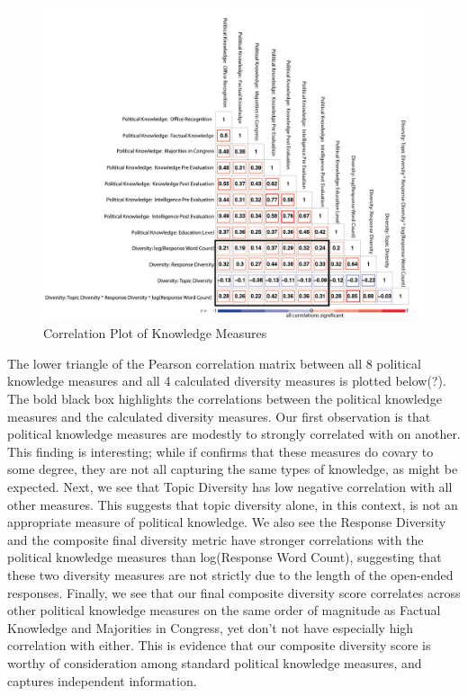 \documentclass[12pt]{article}
\begin{document}
\begin{figure}
\includegraphics[width=\textwidth]{../fig/corr_fixed_data.png}
\caption{Correlation Plot of Knowledge Measures}
\end{figure}

The lower triangle of the Pearson correlation matrix between all 8 political knowledge measures and all 4 calculated diversity measures is plotted below(?).  The bold black box highlights the correlations between the political knowledge measures and the calculated diversity measures.  Our first observation is that political knowledge measures are modestly to strongly correlated with on another.  This finding is interesting; while if confirms that these measures do covary to some degree, they are not all capturing the same types of knowledge, as might be expected.  Next, we see that Topic Diversity has low negative correlation with all other measures.  This suggests that topic diversity alone, in this context, is not an appropriate measure of political knowledge.  We also see the Response Diversity and the composite final diversity metric have stronger correlations with the political knowledge measures than log(Response Word Count), suggesting that these two diversity measures are not strictly due to the length of the open-ended responses.  Finally, we see that our final composite diversity score correlates across other political knowledge measures on the same order of magnitude as Factual Knowledge and Majorities in Congress, yet don’t not have especially high correlation with either.  This is evidence that our composite diversity score is worthy of consideration among standard political knowledge measures, and captures independent information.    
\end{document}
